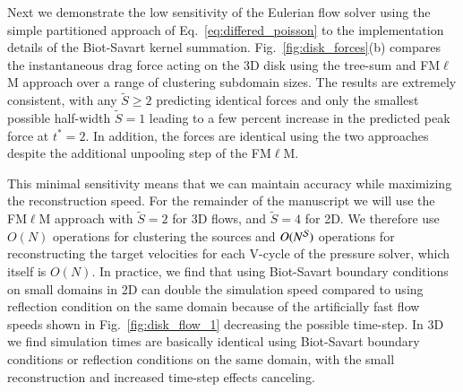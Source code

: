 \documentclass[final,1p,times]{elsarticle}
\begin{document}

Next we demonstrate the low sensitivity of the Eulerian flow solver using the simple partitioned approach of Eq.~\ref{eq:differed_poisson} to the implementation details of the Biot-Savart kernel summation. Fig.~\ref{fig:disk_forces}(b) compares the instantaneous drag force acting on the 3D disk using the tree-sum and FM$\ell$M approach over a range of clustering subdomain sizes. The results are extremely consistent, with any $\tilde S \ge 2$ predicting identical forces and only the smallest possible half-width $\tilde S=1$ leading to a few percent increase in the predicted peak force at $t^*=2$. In addition, the forces are identical using the two approaches despite the additional unpooling step of the FM$\ell$M.

This minimal sensitivity means that we can maintain accuracy while maximizing the reconstruction speed. For the remainder of the manuscript we will use the FM$\ell$M approach with $\tilde S = 2$ for 3D flows, and $\tilde S = 4$ for 2D. We therefore use $O(N)$ operations for clustering the sources and $O(N^{\cal S})$ operations for reconstructing the target velocities for each V-cycle of the pressure solver, which itself is $O(N)$. In practice, we find that using Biot-Savart boundary conditions on small domains in 2D can double the simulation speed compared to using reflection condition on the same domain because of the artificially fast flow speeds shown in Fig.~\ref{fig:disk_flow_1} decreasing the possible time-step. In 3D we find simulation times are basically identical using Biot-Savart boundary conditions or reflection conditions on the same domain, with the small reconstruction and increased time-step effects canceling.


\end{document}
